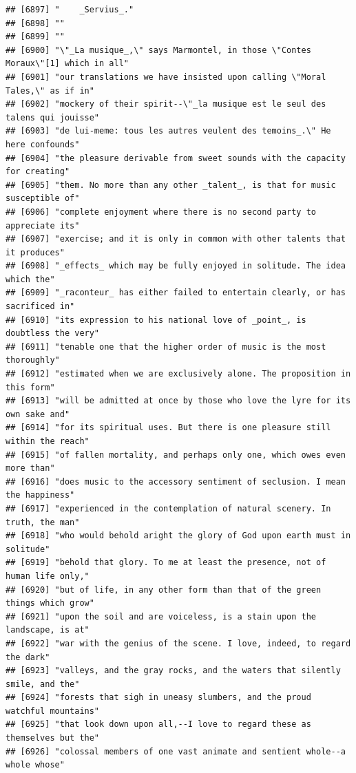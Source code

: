 \documentclass{article}\usepackage[]{graphicx}\usepackage[]{color}
\makeatletter
\newenvironment{kframe}{%
 \def\at@end@of@kframe{}%
 \ifinner\ifhmode%
  \def\at@end@of@kframe{\end{minipage}}%
  \begin{minipage}{\columnwidth}%
 \fi\fi%
 \def\FrameCommand##1{\hskip\@totalleftmargin \hskip-\fboxsep
 \colorbox{shadecolor}{##1}\hskip-\fboxsep
     \hskip-\linewidth \hskip-\@totalleftmargin \hskip\columnwidth}%
 \MakeFramed {\advance\hsize-\width
   \@totalleftmargin\z@ \linewidth\hsize
   \@setminipage}}%
 {\par\unskip\endMakeFramed%
 \at@end@of@kframe}
\newenvironment{knitrout}{}{} %
\makeatother
\begin{document}
\begin{knitrout}
\begin{kframe}
\begin{verbatim}
## [6897] "    _Servius_."                                                              
## [6898] ""                                                                            
## [6899] ""                                                                            
## [6900] "\"_La musique_,\" says Marmontel, in those \"Contes Moraux\"[1] which in all"
## [6901] "our translations we have insisted upon calling \"Moral Tales,\" as if in"    
## [6902] "mockery of their spirit--\"_la musique est le seul des talens qui jouisse"   
## [6903] "de lui-meme: tous les autres veulent des temoins_.\" He here confounds"      
## [6904] "the pleasure derivable from sweet sounds with the capacity for creating"     
## [6905] "them. No more than any other _talent_, is that for music susceptible of"     
## [6906] "complete enjoyment where there is no second party to appreciate its"         
## [6907] "exercise; and it is only in common with other talents that it produces"      
## [6908] "_effects_ which may be fully enjoyed in solitude. The idea which the"        
## [6909] "_raconteur_ has either failed to entertain clearly, or has sacrificed in"    
## [6910] "its expression to his national love of _point_, is doubtless the very"       
## [6911] "tenable one that the higher order of music is the most thoroughly"           
## [6912] "estimated when we are exclusively alone. The proposition in this form"       
## [6913] "will be admitted at once by those who love the lyre for its own sake and"    
## [6914] "for its spiritual uses. But there is one pleasure still within the reach"    
## [6915] "of fallen mortality, and perhaps only one, which owes even more than"        
## [6916] "does music to the accessory sentiment of seclusion. I mean the happiness"    
## [6917] "experienced in the contemplation of natural scenery. In truth, the man"      
## [6918] "who would behold aright the glory of God upon earth must in solitude"        
## [6919] "behold that glory. To me at least the presence, not of human life only,"     
## [6920] "but of life, in any other form than that of the green things which grow"     
## [6921] "upon the soil and are voiceless, is a stain upon the landscape, is at"       
## [6922] "war with the genius of the scene. I love, indeed, to regard the dark"        
## [6923] "valleys, and the gray rocks, and the waters that silently smile, and the"    
## [6924] "forests that sigh in uneasy slumbers, and the proud watchful mountains"      
## [6925] "that look down upon all,--I love to regard these as themselves but the"      
## [6926] "colossal members of one vast animate and sentient whole--a whole whose"      

\end{verbatim}
\end{kframe}
\end{knitrout}
\end{document}
